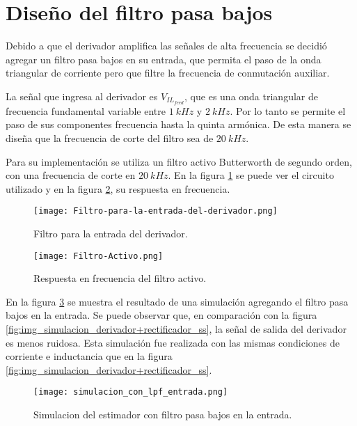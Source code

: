 \section{Diseño del filtro pasa bajos}

Debido a que el derivador amplifica las señales de alta frecuencia se decidió agregar un filtro pasa bajos en su entrada, que permita el paso de la onda triangular de corriente pero que filtre la frecuencia de conmutación auxiliar. 

La señal que ingresa al derivador es $V_{IL_{feed}}$, que es una onda triangular de frecuencia fundamental variable entre $1\:kHz$ y $2\:kHz$. Por lo tanto se permite el paso de sus componentes frecuencia hasta la quinta armónica. De esta manera se diseña que la frecuencia de corte del filtro sea de $20\:kHz$.

Para su implementación se utiliza un filtro activo Butterworth de segundo orden, con una frecuencia de corte en $20\:kHz$. En la figura  \ref{fig:img_Filtro-para-la-entrada-del-derivador} se puede ver el circuito utilizado y en la figura \ref{fig:img_Respuesta-en-frecuencia-del-filtro-activo}, su respuesta en frecuencia.

\begin{figure}[H]
	\centering
	\texttt{[image: Filtro-para-la-entrada-del-derivador.png]}
	\caption{Filtro para la entrada del derivador.}
	\label{fig:img_Filtro-para-la-entrada-del-derivador}
\end{figure}

\begin{figure}[H]
	\centering
	\texttt{[image: Filtro-Activo.png]}
	\caption{Respuesta en frecuencia del filtro activo.}
	\label{fig:img_Respuesta-en-frecuencia-del-filtro-activo}
\end{figure}

En la figura \ref{fig:img_simulacion_lpf_entrada} se muestra el resultado de una simulación agregando el filtro pasa bajos en la entrada. Se puede observar que, en comparación con la figura \ref{fig:img_simulacion_derivador+rectificador_ss}, la señal de salida del derivador es menos ruidosa. Esta simulación fue realizada con las mismas condiciones de corriente e inductancia que en la figura \ref{fig:img_simulacion_derivador+rectificador_ss}.

\begin{figure}[H]
	\centering
	\texttt{[image: simulacion\_con\_lpf\_entrada.png]}
	\caption{Simulacion del estimador con filtro pasa 	bajos en la entrada.}
	\label{fig:img_simulacion_lpf_entrada}
\end{figure}



